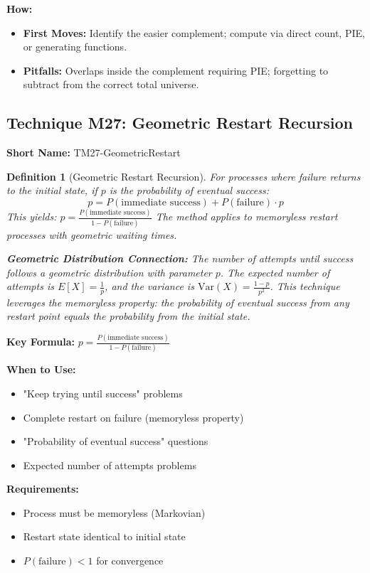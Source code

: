 \documentclass[12pt]{article}
\newtheorem{definition}{Definition}[section]
\begin{document}
\textbf{How:}
\begin{itemize}
    \item \textbf{First Moves:} Identify the easier complement; compute via direct count, PIE, or generating functions.
    \item \textbf{Pitfalls:} Overlaps inside the complement requiring PIE; forgetting to subtract from the correct total universe.
\end{itemize}

\subsection{Technique M27: Geometric Restart Recursion}
\textbf{Short Name:} TM27-GeometricRestart

\begin{definition}[Geometric Restart Recursion]
For processes where failure returns to the initial state, if $p$ is the probability of eventual success:
\[
p = P(\text{immediate success}) + P(\text{failure}) \cdot p
\]
This yields: $p = \frac{P(\text{immediate success})}{1 - P(\text{failure})}$
The method applies to memoryless restart processes with geometric waiting times.

\textbf{Geometric Distribution Connection:} The number of attempts until success follows a geometric distribution with parameter $p$. The expected number of attempts is $E[X] = \frac{1}{p}$, and the variance is $\text{Var}(X) = \frac{1-p}{p^2}$. This technique leverages the memoryless property: the probability of eventual success from any restart point equals the probability from the initial state.
\end{definition}

\begin{tcolorbox}[colback=blue!5!white,colframe=blue!75!black,title=Quick Reference: Geometric Restart Recursion]
\textbf{Key Formula:} $p = \frac{P(\text{immediate success})}{1 - P(\text{failure})}$

\textbf{When to Use:}
\begin{itemize}
    \item "Keep trying until success" problems
    \item Complete restart on failure (memoryless property)
    \item "Probability of eventual success" questions
    \item Expected number of attempts problems
\end{itemize}

\textbf{Requirements:}
\begin{itemize}
    \item Process must be memoryless (Markovian)
    \item Restart state identical to initial state
    \item $P(\text{failure}) < 1$ for convergence
\end{itemize}
\end{tcolorbox}
\end{document}
